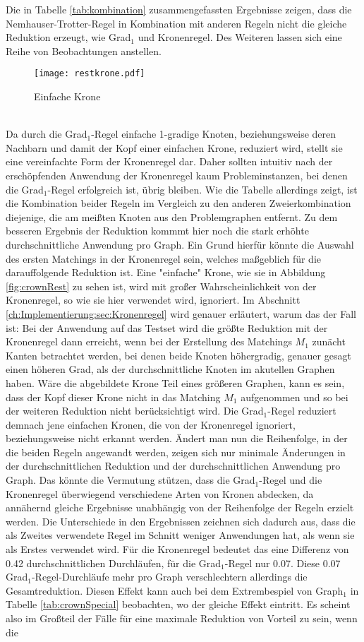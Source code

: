 Die in Tabelle \ref{tab:kombination} zusammengefassten Ergebnisse zeigen, dass die Nemhauser-Trotter-Regel in Kombination mit anderen Regeln nicht die gleiche Reduktion erzeugt, wie Grad$_{1}$ und Kronenregel. Des Weiteren lassen sich eine Reihe von Beobachtungen anstellen.
\begin{figure}[htb]
\centering
  	{\texttt{[image: restkrone.pdf]}}
	\caption{Einfache Krone\label{fig:restcrown}}
\centering
\end{figure}
\\
Da durch die Grad$_{1}$-Regel einfache 1-gradige Knoten, beziehungsweise deren Nachbarn und damit der Kopf einer einfachen Krone, reduziert wird, stellt sie eine vereinfachte Form der Kronenregel dar. Daher sollten intuitiv nach der erschöpfenden Anwendung der Kronenregel kaum Probleminstanzen, bei denen die Grad$_{1}$-Regel erfolgreich ist, übrig bleiben. Wie die Tabelle allerdings zeigt, ist die Kombination beider Regeln im Vergleich zu den anderen Zweierkombination diejenige, die am meißten Knoten aus den Problemgraphen entfernt. Zu dem besseren Ergebnis der Reduktion kommmt hier noch die stark erhöhte durchschnittliche Anwendung pro Graph. Ein Grund hierfür könnte die Auswahl des ersten Matchings in der Kronenregel sein, welches maßgeblich für die darauffolgende Reduktion ist. Eine "einfache" Krone, wie sie in Abbildung \ref{fig:crownRest} zu sehen ist, wird mit großer Wahrscheinlichkeit von der Kronenregel, so wie sie hier verwendet wird, ignoriert. Im Abschnitt \ref{ch:Implementierung:sec:Kronenregel} wird genauer erläutert, warum das der Fall ist: Bei der Anwendung auf das Testset wird die größte Reduktion mit der Kronenregel dann erreicht, wenn bei der Erstellung des Matchings $M_{1}$ zunächt Kanten betrachtet werden, bei denen beide Knoten höhergradig, genauer gesagt einen höheren Grad, als der durchschnittliche Knoten im akutellen Graphen haben. Wäre die abgebildete Krone Teil eines größeren Graphen, kann es sein, dass der Kopf dieser Krone nicht in das Matching $M_{1}$ aufgenommen und so bei der weiteren Reduktion nicht berücksichtigt wird. Die Grad$_{1}$-Regel reduziert demnach jene einfachen Kronen, die von der Kronenregel ignoriert, beziehungsweise nicht erkannt werden. Ändert man nun die Reihenfolge, in der die beiden Regeln angewandt werden, zeigen sich nur minimale Änderungen in der durchschnittlichen Reduktion und der durchschnittlichen Anwendung pro Graph. Das könnte die Vermutung stützen, dass die Grad$_{1}$-Regel und die Kronenregel überwiegend verschiedene Arten von Kronen abdecken, da annähernd gleiche Ergebnisse unabhängig von der Reihenfolge der Regeln erzielt werden. Die Unterschiede in den Ergebnissen zeichnen sich dadurch aus, dass die als Zweites verwendete Regel im Schnitt weniger Anwendungen hat, als wenn sie als Erstes verwendet wird. Für die Kronenregel bedeutet das eine Differenz von 0.42 durchschnittlichen Durchläufen, für die Grad$_{1}$-Regel nur 0.07. Diese 0.07 Grad$_{1}$-Regel-Durchläufe mehr pro Graph verschlechtern allerdings die Gesamtreduktion. Diesen Effekt kann auch bei dem Extrembespiel von Graph${_1}$ in Tabelle \ref{tab:crownSpecial} beobachten, wo der gleiche Effekt eintritt. Es scheint also im Großteil der Fälle für eine maximale Reduktion von Vorteil zu sein, wenn die 